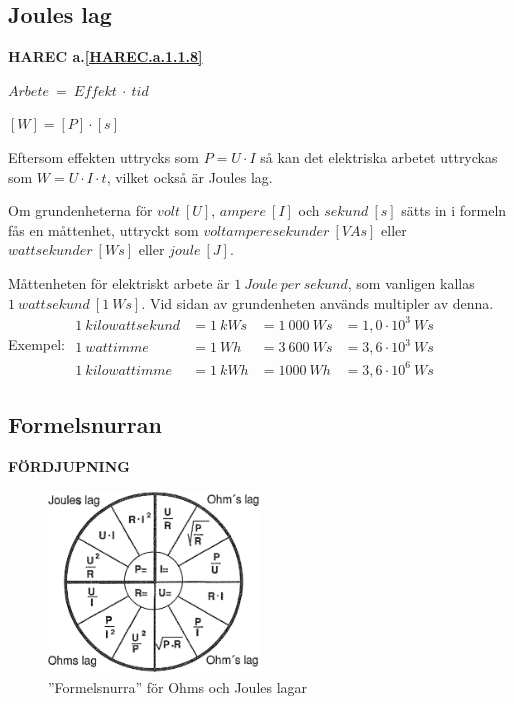 \subsection{Joules lag}
\textbf{HAREC a.\ref{HAREC.a.1.1.8}\label{myHAREC.a.1.1.8}}

\(Arbete\ =\ Effekt\ \cdot\ tid\)

\([W] = [P] \cdot [s]\)

Eftersom effekten uttrycks som \(P = U \cdot I\) så kan det elektriska arbetet
uttryckas som \(W = U \cdot I \cdot t\), vilket också är Joules lag.

Om grundenheterna för \(volt\ [U]\), \(ampere\ [I]\) och \(sekund\ [s]\) sätts in i
formeln fås en måttenhet, uttryckt som \(voltamperesekunder\ [VAs]\) eller
\(wattsekunder\ [Ws]\) eller \(joule\ [J]\).

Måttenheten för elektriskt arbete är \(1\ Joule\ per\ sekund\), som vanligen kallas
\(1\ wattsekund\ [1\ Ws]\).
Vid sidan av grundenheten används multipler
av denna.
Exempel:
\(
\begin{array}{llll}
1\ kilowattsekund & = 1\ kWs & = 1\ 000\ Ws & = 1,0 \cdot 10^3\ Ws\\
1\ wattimme & = 1\ Wh & = 3\ 600\ Ws & = 3,6 \cdot 10^3\ Ws \\
1\ kilowattimme & = 1\ kWh & = 1 000\ Wh & = 3,6 \cdot 10^6\ Ws
\end{array}
\)

\subsection{Formelsnurran}
\textbf{FÖRDJUPNING}

\begin{figure}[h]
\begin{center}
  \includegraphics[width=0.5\textwidth]{images/cropped_pdfs/bild_2_1-04.pdf}
  \caption{''Formelsnurra'' för Ohms och Joules lagar}
  \label{fig:BildII1-4}
\end{center}
\end{figure}

